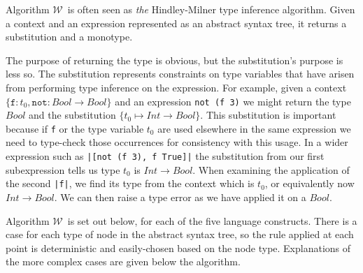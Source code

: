 \documentclass[a4paper,fleqn,oneside,12pt]{report}
\newcommand{\W}{$\mathcal{W}$}
\begin{document}
Algorithm \W\ is often seen as \textit{the} Hindley-Milner type inference algorithm. Given a context and an expression represented as an abstract syntax tree, it returns a substitution and a monotype.

The purpose of returning the type is obvious, but the substitution's purpose is less so. The substitution represents constraints on type variables that have arisen from performing type inference on the expression. For example, given a context $\{ \mathtt{f} : t_0, \mathtt{not} : Bool \rightarrow Bool \}$ and an expression \texttt{not (f 3)} we might return the type $Bool$ and the substitution $\{ t_0 \mapsto Int \rightarrow Bool \}$. This substitution is important because if \texttt{f} or the type variable $t_0$ are used elsewhere in the same expression we need to type-check those occurrences for consistency with this usage. In a wider expression such as \texttt{|[not (f 3), f True]|} the substitution from our first subexpression tells us type $t_0$ is $Int \rightarrow Bool$. When examining the application of the second \texttt{|f|}, we find its type from the context which is $t_0$, or equivalently now $Int \rightarrow Bool$. We can then raise a type error as we have applied it on a $Bool$.

Algorithm \W\ is set out below, for each of the five language constructs. There is a case for each type of node in the abstract syntax tree, so the rule applied at each point is deterministic and easily-chosen based on the node type. Explanations of the more complex cases are given below the algorithm.
\end{document}
